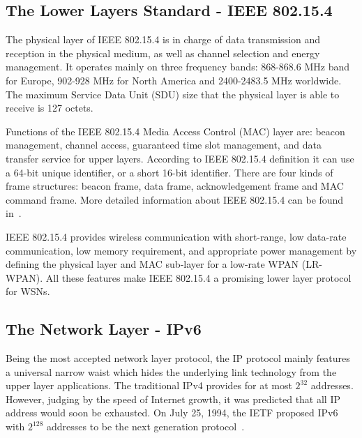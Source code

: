 \subsection{The Lower Layers Standard - IEEE 802.15.4}
\label{General:WSN:IEEE}
The physical layer of IEEE 802.15.4 is in charge of data transmission and reception in the physical medium, as well as channel selection and energy management. It operates mainly on three frequency bands: 868-868.6 MHz band for Europe, 902-928 MHz for North America and 2400-2483.5 MHz worldwide. The maximum Service Data Unit (SDU) size that the physical layer is able to receive is 127 octets. 
\newline

Functions of the IEEE 802.15.4 Media Access Control (MAC) layer are: beacon management, channel access, guaranteed time slot management, and data transfer service for upper layers. According to IEEE 802.15.4 definition it can use a 64-bit unique identifier, or a short 16-bit identifier. There are four kinds of frame structures: beacon frame, data frame, acknowledgement frame and MAC command frame. More detailed information about IEEE 802.15.4 can be found in~\cite{IEEE 802.15.4}.
\newline

IEEE 802.15.4 provides wireless communication with short-range, low data-rate communication, low memory requirement, and appropriate power management by defining the physical layer and MAC sub-layer for a low-rate WPAN (LR-WPAN)\@. All these features make IEEE 802.15.4 a promising lower layer protocol for WSNs. 

\subsection{The Network Layer - IPv6}
\label{General:WSN:IPv6}

Being the most accepted network layer protocol, the IP protocol mainly features a universal narrow waist which hides the underlying link technology from the upper layer applications. The traditional IPv4 provides for at most $2^{32}$ addresses. However, judging by the speed of Internet growth, it was predicted that all IP address would soon be exhausted. On July 25, 1994, the IETF proposed IPv6 with $2^{128}$ addresses to be the next generation protocol~\cite{RFC 1752}.
\newline

